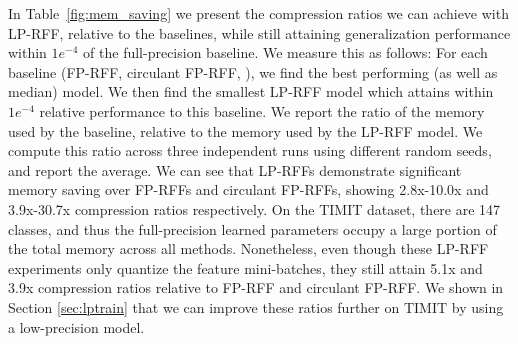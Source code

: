 In Table~\ref{fig:mem_saving} we present the compression ratios we can achieve with LP-RFF, relative to the baselines, while still attaining generalization performance within $1e^{-4}$ of the full-precision baseline.  We measure this as follows:  For each baseline (FP-RFF, circulant FP-RFF, \Nystrom), we find the best performing (as well as median) model.  We then find the smallest LP-RFF model which attains within $1e^{-4}$ relative performance to this baseline.  We report the ratio of the memory used by the baseline, relative to the memory used by the LP-RFF model.  We compute this ratio across three independent runs using different random seeds, and report the average.  We can see that LP-RFFs demonstrate significant memory saving over FP-RFFs and circulant FP-RFFs, showing 2.8x-10.0x and 3.9x-30.7x compression ratios respectively. On the TIMIT dataset, there are 147 classes, and thus the full-precision learned parameters occupy a large portion of the total memory across all methods. Nonetheless, even though these LP-RFF experiments only quantize the feature mini-batches, they still attain 5.1x and 3.9x compression ratios relative to FP-RFF and circulant FP-RFF.  We shown in Section \ref{sec:lptrain} that we can improve these ratios further on TIMIT by using a low-precision model.

